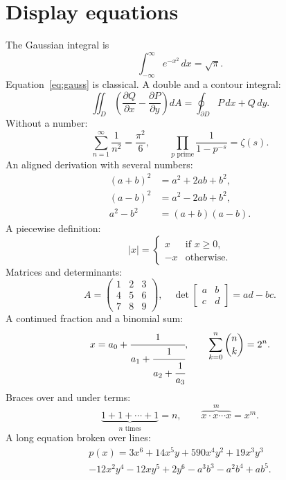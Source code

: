 \documentclass[11pt]{article}
\begin{document}
\section{Display equations}
The Gaussian integral is
\begin{equation}
  \int_{-\infty}^{\infty} e^{-x^2}\,dx = \sqrt{\pi}.
  \label{eq:gauss}
\end{equation}
Equation~\eqref{eq:gauss} is classical. A double and a contour integral:
\begin{equation}
  \iint_{D} \left( \frac{\partial Q}{\partial x} - \frac{\partial P}{\partial y} \right) dA = \oint_{\partial D} P\,dx + Q\,dy .
\end{equation}
Without a number:
\[
  \sum_{n=1}^{\infty} \frac{1}{n^2} = \frac{\pi^2}{6}, \qquad \prod_{p \text{ prime}} \frac{1}{1-p^{-s}} = \zeta(s).
\]
An aligned derivation with several numbers:
\begin{align}
  (a+b)^2 &= a^2 + 2ab + b^2, \\
  (a-b)^2 &= a^2 - 2ab + b^2, \\
  a^2 - b^2 &= (a+b)(a-b).
\end{align}
A piecewise definition:
\begin{equation}
  |x| = \begin{cases} x & \text{if } x \geq 0, \\ -x & \text{otherwise.} \end{cases}
\end{equation}
Matrices and determinants:
\begin{equation}
  A = \begin{pmatrix} 1 & 2 & 3 \\ 4 & 5 & 6 \\ 7 & 8 & 9 \end{pmatrix}, \quad
  \det\begin{bmatrix} a & b \\ c & d \end{bmatrix} = ad - bc .
\end{equation}
A continued fraction and a binomial sum:
\begin{equation}
  x = a_0 + \cfrac{1}{a_1 + \cfrac{1}{a_2 + \cfrac{1}{a_3}}}, \qquad \sum_{k=0}^{n}\binom{n}{k} = 2^n .
\end{equation}
Braces over and under terms:
\begin{equation*}
  \underbrace{1 + 1 + \cdots + 1}_{n \text{ times}} = n, \qquad \overbrace{x \cdot x \cdots x}^{m} = x^m .
\end{equation*}
A long equation broken over lines:
\begin{multline}
  p(x) = 3x^6 + 14x^5y + 590x^4y^2 + 19x^3y^3 \\
  - 12x^2y^4 - 12xy^5 + 2y^6 - a^3b^3 - a^2b^4 + ab^5 .
\end{multline}
\end{document}

